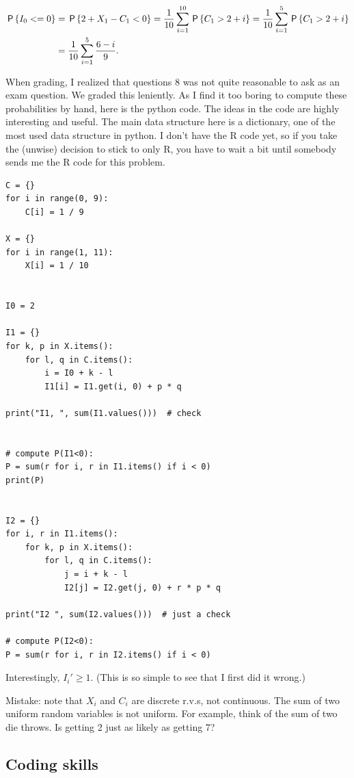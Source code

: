 \documentclass[../../assignments/assignments]{subfiles}
\begin{document}
\begin{exercise}
\begin{solution}
\begin{align}
\P{I_{0} < = 0} &= \P{2 + X_{1} - C_{1} < 0} = \frac{1}{10} \sum_{i=1}^{10} \P{C_{1} > 2 + i } = \frac{1}{10} \sum_{i=1}^{5} \P{C_{1} > 2 + i } \\
&= \frac{1}{10} \sum_{i=1}^{5} \frac{6-i}{9}.
\end{align}

When grading, I realized that questions 8 was not quite reasonable to ask as an exam question.
We graded this leniently.
As I find it too boring to compute these probabilities by hand, here is the python code.
The ideas in the code are highly interesting and useful.
The main data structure here is a dictionary, one of the most used data structure in python.
I don't have the R code yet, so if you take the (unwise) decision to stick to only R, you have to wait a bit until somebody sends me the R code for this problem.
\begin{verbatim}
C = {}
for i in range(0, 9):
    C[i] = 1 / 9

X = {}
for i in range(1, 11):
    X[i] = 1 / 10


I0 = 2

I1 = {}
for k, p in X.items():
    for l, q in C.items():
        i = I0 + k - l
        I1[i] = I1.get(i, 0) + p * q

print("I1, ", sum(I1.values()))  # check


# compute P(I1<0):
P = sum(r for i, r in I1.items() if i < 0)
print(P)


I2 = {}
for i, r in I1.items():
    for k, p in X.items():
        for l, q in C.items():
            j = i + k - l
            I2[j] = I2.get(j, 0) + r * p * q

print("I2 ", sum(I2.values()))  # just a check

# compute P(I2<0):
P = sum(r for i, r in I2.items() if i < 0)
\end{verbatim}

Interestingly, $I_{i}'\geq 1$. (This is so simple to see that I first did it wrong.)



Mistake: note that $X_{i}$   and $C_{i}$ are discrete r.v.s, not continuous.
The sum of two uniform random variables is not uniform. For example, think of the sum of two die throws. Is getting 2 just as likely as getting 7?
\end{solution}


\end{exercise}

\subsection{Coding skills}
\end{document}
